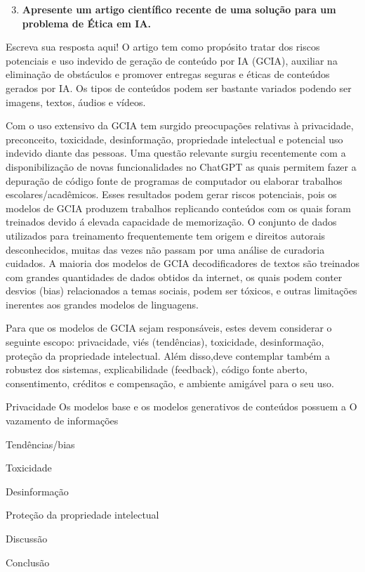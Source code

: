 \begin{enumerate}\setcounter{enumi}{2}\bfseries
    \item  \textbf{Apresente um artigo científico recente de uma solução para um problema de Ética em IA.}
\end{enumerate}

Escreva sua resposta aqui!
O artigo \cite{chen_fu_lyu} tem como propósito tratar dos riscos potenciais e uso indevido de geração de conteúdo 
por IA (GCIA), 
auxiliar na eliminação de obstáculos e promover entregas seguras e éticas de conteúdos gerados por IA. 
Os tipos de conteúdos podem ser bastante variados podendo ser imagens, textos, áudios e vídeos. 


Com o uso extensivo da GCIA tem surgido preocupações relativas à privacidade, preconceito, toxicidade, desinformação, 
propriedade intelectual e potencial uso indevido diante das pessoas. Uma questão relevante surgiu recentemente com a 
disponibilização de novas funcionalidades no ChatGPT as quais permitem fazer a depuração de código fonte de programas de 
computador ou elaborar trabalhos escolares/acadêmicos. Esses resultados podem gerar riscos potenciais, pois os modelos 
de GCIA produzem trabalhos replicando conteúdos com os quais foram treinados devido á elevada capacidade de memorização.
O conjunto de dados utilizados para 
treinamento frequentemente tem origem e direitos autorais desconhecidos, muitas das vezes não passam por uma análise 
de curadoria cuidados. A maioria dos modelos de GCIA decodificadores de textos são treinados com grandes quantidades 
de dados obtidos da internet, os quais podem conter desvios (bias) relacionados a temas sociais, podem ser tóxicos, 
e outras limitações inerentes aos grandes modelos de linguagens.

Para que os modelos de GCIA sejam responsáveis, estes devem considerar o seguinte escopo: 
privacidade, viés (tendências), toxicidade, desinformação, proteção da propriedade intelectual. 
Além disso,deve contemplar também a robustez dos sistemas, explicabilidade (feedback),
código fonte aberto, consentimento, créditos e compensação, e ambiente amigável para o seu uso.


Privacidade
Os modelos base e os modelos generativos de conteúdos possuem a  O vazamento de informações 


Tendências/bias

Toxicidade

Desinformação

Proteção da propriedade intelectual

Discussão 

Conclusão 

